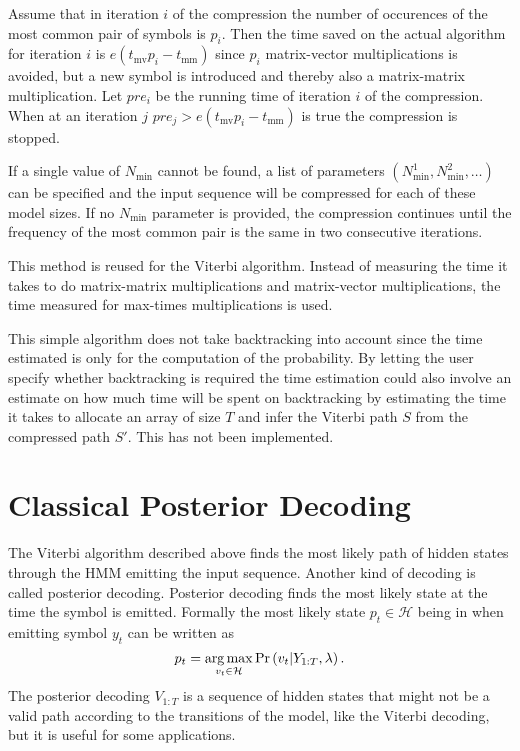 Assume that in iteration $i$ of the compression the number of occurences
of the most common pair of symbols is $p_i$. Then the time saved on the actual
algorithm for iteration $i$ is $e (t_{\text{mv}} p_i - t_{\text{mm}})$ since
$p_i$ matrix-vector multiplications is avoided, but a new symbol is introduced
and thereby also a matrix-matrix multiplication. Let $pre_i$ be the running
time of iteration $i$ of the compression. When at an iteration $j$
$pre_j > e (t_{\text{mv}} p_i - t_{\text{mm}})$ is true the compression is
stopped.

If a single value of
$N_{\text{min}}$ cannot be found, a list of parameters
$(N_{\text{min}}^1, N_{\text{min}}^2, \dots)$ can be specified and the input
sequence will be compressed for each of these model sizes. If no
$N_{\text{min}}$ parameter is provided, the compression continues until the
frequency of the most common pair is the same in two consecutive iterations.

This method is reused for the Viterbi algorithm. Instead of measuring the
time it takes to do matrix-matrix multiplications and matrix-vector
multiplications, the time measured for max-times multiplications is used.

This simple algorithm does not take backtracking into account since the time
estimated is only for the computation of the probability. By letting the user
specify whether backtracking is required the time estimation could also
involve an estimate on how much time will be spent on backtracking by
estimating the time it takes to allocate an array of size $T$ and
infer the Viterbi path $S$ from the compressed path $S'$. This has
not been implemented.

\section{Classical Posterior Decoding}
\label{sec:posterior-decoding-1}

The Viterbi algorithm described above finds the most likely path of hidden
states through the HMM emitting the input sequence. Another kind of decoding is
called posterior decoding. Posterior decoding finds the most likely state at
the time the symbol is emitted. Formally the most likely state
$p_t \in \mathcal{H}$ being in when emitting symbol $y_t$ can be written as
\begin{equation*}
  p_t = \operatorname*{arg\,max}_{v_t \in \mathcal{H}} \Pr \left(v_t | Y_{1:T}, \lambda \right).
\end{equation*}
The posterior decoding $V_{1:T}$ is a sequence of hidden states that might not
be a valid path according to the transitions of the model, like the Viterbi
decoding, but it is useful for some applications.


